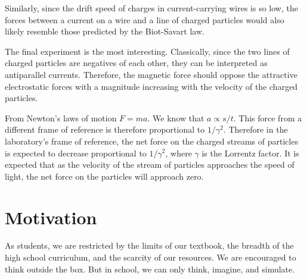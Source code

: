 \documentclass[12pt,letterpaper]{article}
\begin{document}
Similarly, since the drift speed of charges in current-carrying wires is so low, the forces between a current on a wire and a line of charged particles would also likely resemble those predicted by the Biot-Savart law.

The final experiment is the most interesting. Classically, since the two lines of charged particles are negatives of each other, they can be interpreted as antiparallel currents. Therefore, the magnetic force should oppose the attractive electrostatic forces with a magnitude increasing with the velocity of the charged particles.

From Newton's laws of motion $F=ma$. We know that $a\propto{s/t}$. This force from a different frame of reference is therefore proportional to $1/\gamma^2$.
Therefore in the laboratory's frame of reference, the net force on the charged streams of particles is expected to decrease proportional to $1/\gamma^2$, where $\gamma$ is the Lorrentz factor.
It is expected that as the velocity of the stream of particles approaches the speed of light, the net force on the particles will approach zero.


\section{Motivation}

As students, we are restricted by the limits of our textbook, the breadth of the high school curriculum, and the scarcity of our resources. We are encouraged to think outside the box. But in school, we can only think, imagine, and simulate.
\end{document}
